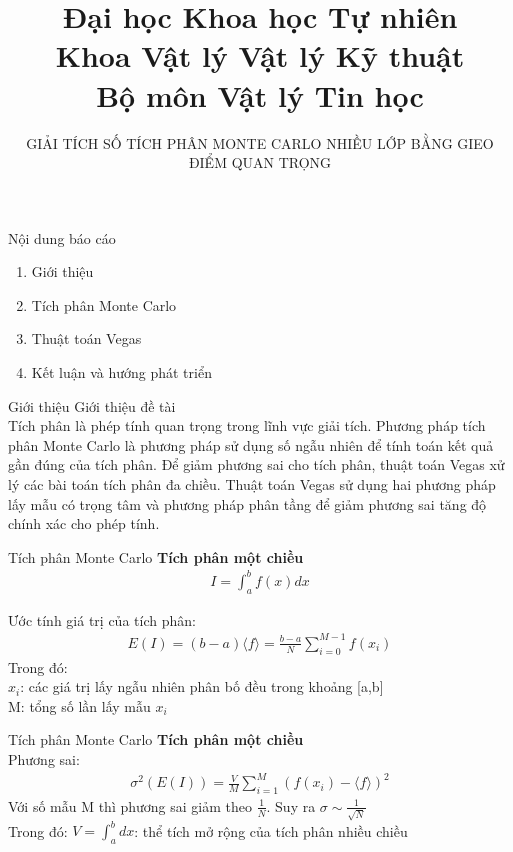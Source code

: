 \documentclass{beamer}
\title[Giải tích số tích phân Monte Carlo nhiều lớp bằng gieo điểm quan trọng]{Đại học Khoa học Tự nhiên\\
Khoa Vật lý Vật lý Kỹ thuật\\
Bộ môn Vật lý Tin học }
\author[Vật lý Tin học]{ \color[rgb]{0.20,0.60,1.0} \Large GIẢI TÍCH SỐ TÍCH PHÂN MONTE CARLO NHIỀU LỚP BẰNG GIEO ĐIỂM QUAN TRỌNG}
\institute[] %
{
  \inst{}%
  \textbf{CBHD}: TS. Nguyễn Chí Linh
  \and
  \inst{}%
  \textbf{SVTH}: Huỳnh Thị Hạ Vy
}
\date[12/07/2019]%
{}
\begin{document}
 
\frame{\titlepage}
\begin{frame}{Nội dung báo cáo}
\fontsize{13pt}{40pt}
\begin{enumerate}
\item Giới thiệu 
\item Tích phân Monte Carlo
\item Thuật toán Vegas
\item Kết luận và hướng phát triển
\end{enumerate}
\end{frame}

\begin{frame}{Giới thiệu}\vspace{4pt}
\color[rgb]{0.20,0.60,1.0} {Giới thiệu đề tài}\\
\vspace{0.5em}
\color[rgb]{0.0,0.00,0.0}
Tích phân là phép tính quan trọng trong lĩnh vực giải tích. Phương pháp tích phân Monte Carlo
là phương pháp sử dụng số ngẫu nhiên để tính toán kết quả gần đúng của tích phân. 
Để giảm phương sai cho tích phân, thuật toán Vegas xử lý các bài toán tích phân đa chiều.
Thuật toán Vegas sử dụng hai phương pháp lấy mẫu có trọng tâm và phương pháp phân tầng để giảm phương sai tăng độ chính xác cho phép tính.
\end{frame}

\begin{frame}{Tích phân Monte Carlo}\vspace{4pt}
  \textbf{Tích phân một chiều}
  \begin{align}
  I=\int_{a}^{b}{f(x)dx}
\end{align}

  Ước tính giá trị của tích phân: 
  \begin{align}
  E(I) = (b-a)\langle{f}\rangle = \frac{b-a}{N}{\sum_{i=0}^{M-1}{f(x_i)}}
\end{align}
Trong đó:\\
  \vspace{1em}
  $x_i$: các giá trị lấy ngẫu nhiên phân bố đều trong khoảng [a,b]\\
  M: tổng số lần lấy mẫu $x_i$\\
\end{frame}

\begin{frame}{Tích phân Monte Carlo}\vspace{4pt}
\textbf{Tích phân một chiều}\\
\vspace{4em}
  Phương sai: 
\begin{align}
  \sigma^2(E(I)) = \frac{V}{M}\sum_{i=1}^M{(f(x_i)-\langle{f}\rangle)^2}
\end{align}
Với số mẫu M thì phương sai giảm theo $\frac{1}{N}$. Suy ra $\sigma \sim \frac{1}{\sqrt{N}}$\\
\vspace{0.5em}
Trong đó: 
$V=\int_{a}^{b}{dx}$: thể tích mở rộng của tích phân nhiều chiều\\
\end{frame}
\end{document}
